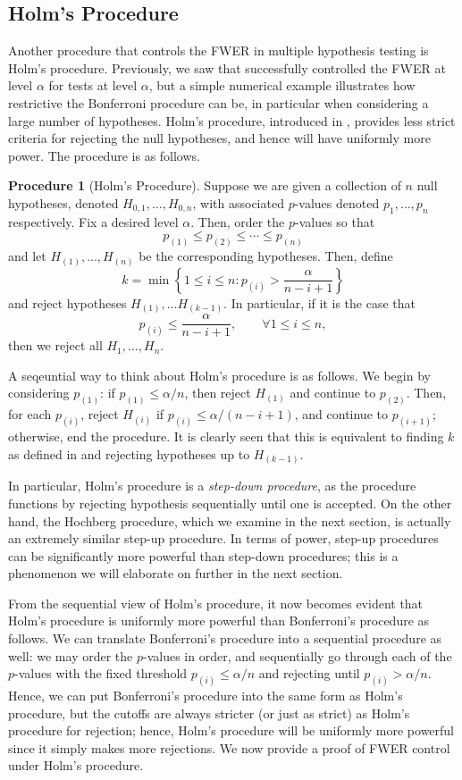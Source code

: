 \documentclass[11pt,reqno]{report}
\theoremstyle{definition}
\newtheorem{proc}[theorem]{Procedure}
\numberwithin{equation}{section}
\begin{document}
\subsection{Holm's Procedure}
Another procedure that controls the FWER in multiple hypothesis testing is Holm's procedure. Previously, we saw that  successfully controlled the FWER at level $\alpha$ for tests at level $\alpha$, but a simple numerical example illustrates how restrictive the Bonferroni procedure can be, in particular when considering a large number of hypotheses. Holm's procedure, introduced in \cite{holms}, provides less strict criteria for rejecting the null hypotheses, and hence will have uniformly more power. The procedure is as follows.
\begin{proc}[Holm's Procedure]
\label{holmproc}
Suppose we are given a collection of $n$ null hypotheses, denoted $H_{0, 1}, \ldots, H_{0, n}$, with associated $p$-values denoted $p_1, \ldots, p_n$ respectively. Fix a desired level $\alpha$. Then, order the $p$-values so that
\[ p_{(1)} \leq p_{(2)} \leq \cdots \leq p_{(n)} \] and let $H_{(1)}, \ldots, H_{(n)}$ be the corresponding hypotheses. Then, define
\[ k = \min \left\{ 1 \leq i \leq n : p_{(i)} > \frac{\alpha}{n - i + 1} \right \}  \] and reject hypotheses $H_{(1)}, \ldots H_{(k-1)}$. In particular, if it is the case that 
\[ p_{(i)} \leq \frac{\alpha}{n - i + 1}, \qquad \forall 1 \leq i \leq n, \] then we reject all $H_1, \ldots, H_n$.
\end{proc}
\begin{note*}
A seqeuntial way to think about Holm's procedure is as follows. We begin by considering $p_{(1)}$: if $p_{(1)} \leq \alpha / n$, then reject $H_{(1)}$ and continue to $p_{(2)}$. Then, for each $p_{(i)}$, reject $H_{(i)}$ if $p_{(i)} \leq \alpha / (n - i + 1)$, and continue to $p_{(i+1)}$; otherwise, end the procedure. It is clearly seen that this is equivalent to finding $k$ as defined in  and rejecting hypotheses up to $H_{(k-1)}$.

In particular, Holm's procedure is a \emph{step-down procedure}, as the procedure functions by rejecting hypothesis sequentially until one is accepted. On the other hand, the Hochberg procedure, which we examine in the next section, is actually an extremely similar step-up procedure. In terms of power, step-up procedures can be significantly more powerful than step-down procedures; this is a phenomenon we will elaborate on further in the next section.
\end{note*}
From the sequential view of Holm's procedure, it now becomes evident that Holm's procedure is uniformly more powerful than Bonferroni's procedure as follows. We can translate Bonferroni's procedure into a sequential procedure as well: we may order the $p$-values in order, and sequentially go through each of the $p$-values with the fixed threshold $p_{(i)} \leq \alpha / n$ and rejecting until $p_{(i)} > \alpha / n$. Hence, we can put Bonferroni's procedure into the same form as Holm's procedure, but the cutoffs are always stricter (or just as strict) as Holm's procedure for rejection; hence, Holm's procedure will be uniformly more powerful since it simply makes more rejections. We now provide a proof of FWER control under Holm's procedure.
\end{document}
